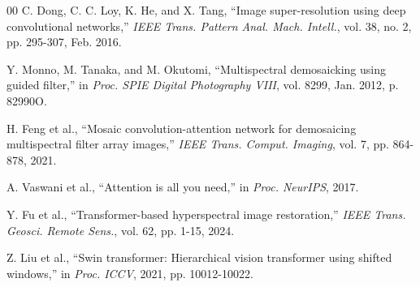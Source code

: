 \documentclass[conference]{IEEEtran}
\begin{document}
\begin{thebibliography}{00}
 C. Dong, C. C. Loy, K. He, and X. Tang, ``Image super-resolution using deep convolutional networks,'' \emph{IEEE Trans. Pattern Anal. Mach. Intell.}, vol. 38, no. 2, pp. 295-307, Feb. 2016.

 Y. Monno, M. Tanaka, and M. Okutomi, ``Multispectral demosaicking using guided filter,'' in \emph{Proc. SPIE Digital Photography VIII}, vol. 8299, Jan. 2012, p. 82990O.

 H. Feng et al., ``Mosaic convolution-attention network for demosaicing multispectral filter array images,'' \emph{IEEE Trans. Comput. Imaging}, vol. 7, pp. 864-878, 2021.

 A. Vaswani et al., ``Attention is all you need,'' in \emph{Proc. NeurIPS}, 2017.

 Y. Fu et al., ``Transformer-based hyperspectral image restoration,'' \emph{IEEE Trans. Geosci. Remote Sens.}, vol. 62, pp. 1-15, 2024.

 Z. Liu et al., ``Swin transformer: Hierarchical vision transformer using shifted windows,'' in \emph{Proc. ICCV}, 2021, pp. 10012-10022.

\end{thebibliography}
\end{document}
